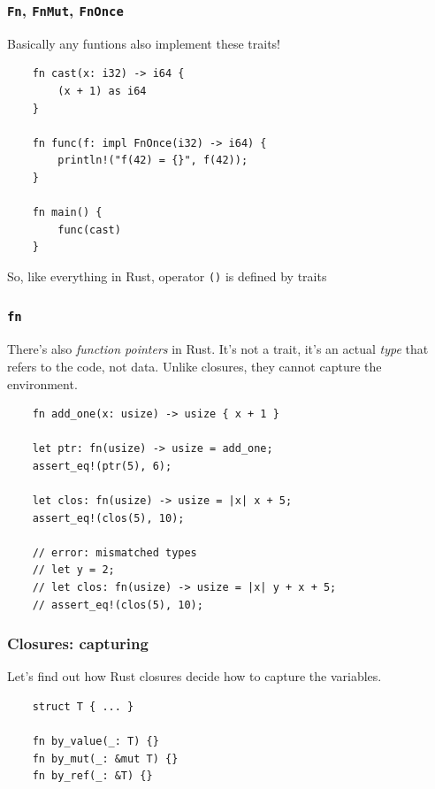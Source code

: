 \documentclass[aspectratio=1610,t]{beamer}
\begin{document}

\begin{frame}[fragile]
\frametitle{\texttt{Fn}, \texttt{FnMut}, \texttt{FnOnce}}
Basically any funtions also implement these traits!

\begin{verbatim}
    fn cast(x: i32) -> i64 {
        (x + 1) as i64
    }

    fn func(f: impl FnOnce(i32) -> i64) {
        println!("f(42) = {}", f(42));
    }

    fn main() {
        func(cast)
    }
\end{verbatim}

So, like everything in Rust, operator \texttt{()} is defined by traits
\end{frame}


\begin{frame}[fragile]
\frametitle{\texttt{fn}}
There's also \textit{function pointers} in Rust. It's not a trait, it's an actual \textit{type} that refers to the code, not data. Unlike closures, they cannot capture the environment.

\begin{verbatim}
    fn add_one(x: usize) -> usize { x + 1 }

    let ptr: fn(usize) -> usize = add_one;
    assert_eq!(ptr(5), 6);

    let clos: fn(usize) -> usize = |x| x + 5;
    assert_eq!(clos(5), 10);

    // error: mismatched types
    // let y = 2;
    // let clos: fn(usize) -> usize = |x| y + x + 5;
    // assert_eq!(clos(5), 10);
\end{verbatim}
\end{frame}


\begin{frame}[fragile]
\frametitle{Closures: capturing}
Let's find out how Rust closures decide how to capture the variables.

\begin{verbatim}
    struct T { ... }

    fn by_value(_: T) {}
    fn by_mut(_: &mut T) {}
    fn by_ref(_: &T) {}
\end{verbatim}
\end{frame}
\end{document}
